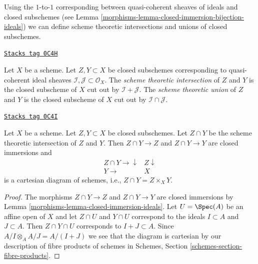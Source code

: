 Using the $1$-to-$1$ corresponding between quasi-coherent sheaves
of ideals and closed subschemes (see
Lemma \ref{morphisms-lemma-closed-immersion-bijection-ideals})
we can define scheme theoretic intersections and unions
of closed subschemes.

\begin{definition}
\label{morphisms-definition-scheme-theoretic-intersection-union}
\href{https://stacks.math.columbia.edu/tag/0C4H}{\texttt{Stacks tag 0C4H}}

Let $X$ be a scheme. Let $Z, Y \subset X$ be closed subschemes
corresponding to quasi-coherent ideal sheaves
$\mathcal{I}, \mathcal{J} \subset \mathcal{O}_X$.
The {\it scheme theoretic intersection} of $Z$ and $Y$
is the closed subscheme of $X$ cut out by $\mathcal{I} + \mathcal{J}$.
The {\it scheme theoretic union} of $Z$ and $Y$
is the closed subscheme of $X$ cut out by
$\mathcal{I} \cap \mathcal{J}$.
\end{definition}

\begin{lemma}
\label{morphisms-lemma-scheme-theoretic-intersection}
\href{https://stacks.math.columbia.edu/tag/0C4I}{\texttt{Stacks tag 0C4I}}

Let $X$ be a scheme. Let $Z, Y \subset X$ be closed subschemes.
Let $Z \cap Y$ be the scheme theoretic intersection of $Z$ and $Y$.
Then $Z \cap Y \to Z$ and $Z \cap Y \to Y$ are closed immersions
and
$$
\begin{array}{cc}Z \cap Y \longrightarrow\downarrow & Z \downarrow \\ Y \longrightarrow & X\end{array}
$$
is a cartesian diagram of schemes, i.e., $Z \cap Y = Z \times_X Y$.
\end{lemma}

\begin{proof}

The morphisms $Z \cap Y \to Z$ and $Z \cap Y \to Y$ are closed immersions
by Lemma \ref{morphisms-lemma-closed-immersion-ideals}.
Let $U = \Spec(A)$ be an affine open of $X$ and let $Z \cap U$ and $Y \cap U$
correspond to the ideals $I \subset A$ and $J \subset A$. Then
$Z \cap Y \cap U$ corresponds to $I + J \subset A$. Since
$A/I \otimes_A A/J = A/(I + J)$ we see that the diagram is
cartesian by our description of fibre products of schemes
in Schemes, Section \ref{schemes-section-fibre-products}.
\end{proof}

